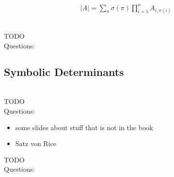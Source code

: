 \documentclass[a4]{scrartcl}
\begin{document}
\begin{align*}
\\
|A| = \sum_{\pi} \sigma(\pi) \prod^{n}_{i=1} A_{i, \pi(i)}
\end{align*}









\ \\

\color{red} TODO \\
\color{black}
\color{violet} Questions: \\
\color{black}
































\subsection*{Symbolic Determinants}



\ \\

\color{red} TODO \\
\color{black}
\color{violet} Questions: \\
\color{black}






\begin{itemize}
\item some slides about stuff that is not in the book
\item Satz von Rice
\end{itemize}


\color{red} TODO \\
\color{black}
\color{violet} Questions: \\
\color{black}



\newpage

\printbibliography
\end{document}
